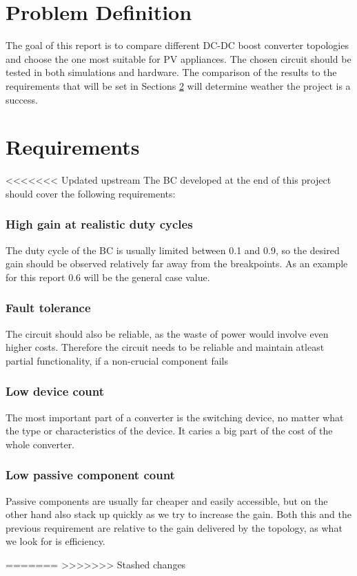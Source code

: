 \section{Problem Definition}\label{sec:probdesc}
The goal of this report is to compare different DC-DC boost converter topologies and choose the one most suitable for PV appliances. The chosen circuit should be tested in both simulations and hardware. The comparison of the results to the requirements that will be set in Sections \ref{sec:req} will determine weather the project is a success. 



\section{Requirements}\label{sec:req}
<<<<<<< Updated upstream
The BC developed at the end of this project should cover the following requirements: 

\subsubsection{High gain at realistic duty cycles}
The duty cycle of the BC is usually limited between 0.1 and 0.9, so the desired gain should be observed relatively far away from the breakpoints. As an example for this report 0.6 will be the general case value. 


\subsubsection{Fault tolerance}
The circuit should also be reliable, as the waste of power would involve even higher costs. Therefore the circuit needs to be reliable and maintain atleast partial functionality, if a non-crucial component fails 


\subsubsection{Low device count}
The most important part of a converter is the switching device, no matter what the type or characteristics of the device. It caries a big part of the cost of the whole converter. 

\subsubsection{Low passive component count}
Passive components are usually far cheaper and easily accessible, but on the other hand also stack up quickly as we try to increase the gain. Both this and the previous requirement are relative to the gain delivered by the topology, as what we look for is efficiency.





=======
>>>>>>> Stashed changes

